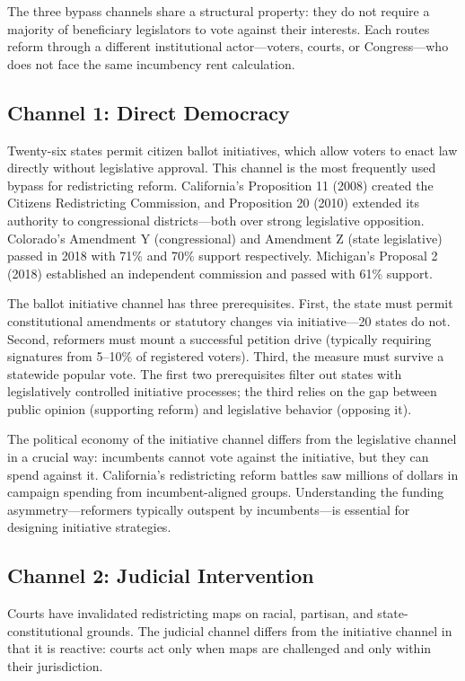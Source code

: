 The three bypass channels share a structural property: they do not require a majority of beneficiary legislators to vote against their interests. Each routes reform through a different institutional actor---voters, courts, or Congress---who does not face the same incumbency rent calculation.

\subsection{Channel 1: Direct Democracy}

Twenty-six states permit citizen ballot initiatives, which allow voters to enact law directly without legislative approval. This channel is the most frequently used bypass for redistricting reform. California's Proposition 11 (2008) created the Citizens Redistricting Commission, and Proposition 20 (2010) extended its authority to congressional districts---both over strong legislative opposition. Colorado's Amendment Y (congressional) and Amendment Z (state legislative) passed in 2018 with 71\% and 70\% support respectively. Michigan's Proposal 2 (2018) established an independent commission and passed with 61\% support.

The ballot initiative channel has three prerequisites. First, the state must permit constitutional amendments or statutory changes via initiative---20 states do not. Second, reformers must mount a successful petition drive (typically requiring signatures from 5--10\% of registered voters). Third, the measure must survive a statewide popular vote. The first two prerequisites filter out states with legislatively controlled initiative processes; the third relies on the gap between public opinion (supporting reform) and legislative behavior (opposing it).

The political economy of the initiative channel differs from the legislative channel in a crucial way: incumbents cannot vote against the initiative, but they can spend against it. California's redistricting reform battles saw millions of dollars in campaign spending from incumbent-aligned groups. Understanding the funding asymmetry---reformers typically outspent by incumbents---is essential for designing initiative strategies.

\subsection{Channel 2: Judicial Intervention}

Courts have invalidated redistricting maps on racial, partisan, and state-constitutional grounds. The judicial channel differs from the initiative channel in that it is reactive: courts act only when maps are challenged and only within their jurisdiction.

